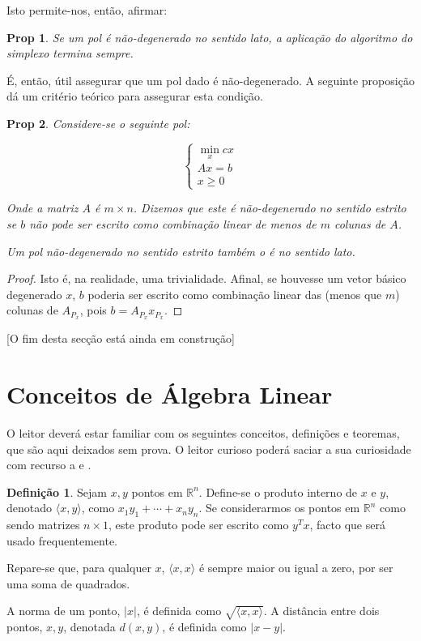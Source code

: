 \documentclass{article}
\newcommand{\R}{\mathbb{R}}
\newtheorem{prop}{Prop}
\theoremstyle{definition}
\newtheorem*{definition*}{Definição}
\begin{document}
	Isto permite-nos, então, afirmar:
	
	\begin{prop}
	Se um pol é não-degenerado no sentido lato, a aplicação do algoritmo do simplexo termina sempre.
	\end{prop}
	
	É, então, útil assegurar que um pol dado é não-degenerado. A seguinte proposição dá um critério teórico para assegurar esta condição.
	
	\begin{prop}
	Considere-se o seguinte pol:
	
	\[
	\begin{cases}
	\min\limits_x cx\\
	Ax = b\\
	x \geq 0
	\end{cases}
	\]
	
	Onde a matriz $A$ é $m \times n$. Dizemos que este é \emph{não-degenerado no sentido estrito} se $b$ não pode ser escrito como combinação linear de menos de $m$ colunas de $A$.
	
	Um pol não-degenerado no sentido estrito também o é no sentido lato.
	\end{prop}
	
	\begin{proof}
	Isto é, na realidade, uma trivialidade. Afinal, se houvesse um vetor básico degenerado $x$, $b$ poderia ser escrito como combinação linear das (menos que $m$) colunas de $A_{P_x}$, pois $b = A_{P_x} x_{P_x}$.
	\end{proof}
	
	[O fim desta secção está ainda em construção]
	
	
	\appendix
	
	\section{Conceitos de Álgebra Linear}
	
	
	O leitor deverá estar familiar com os seguintes conceitos, definições e teoremas, que são aqui deixados sem prova. O leitor curioso poderá saciar a sua curiosidade com recurso a \cite{axler} e \cite{spivak}.
	
	\begin{definition*}
	Sejam $x, y$ pontos em $\R^n$. Define-se o produto interno de $x$ e $y$, denotado $\langle x, y \rangle$, como $x_1 y_1 + \cdots + x_n y_n$. Se considerarmos os pontos em $\R^n$ como sendo matrizes $n \times 1$, este produto pode ser escrito como $y^T x$, facto que será usado frequentemente.
	
	Repare-se que, para qualquer $x$, $\langle x, x \rangle$ é sempre maior ou igual a zero, por ser uma soma de quadrados.
	
	A norma de um ponto, $\lvert x \rvert$, é definida como $\sqrt{\langle x, x \rangle}$. A distância entre dois pontos, $x, y$, denotada $d(x, y)$, é definida como $\lvert x - y \rvert$.
	\end{definition*}
	
\end{document}
